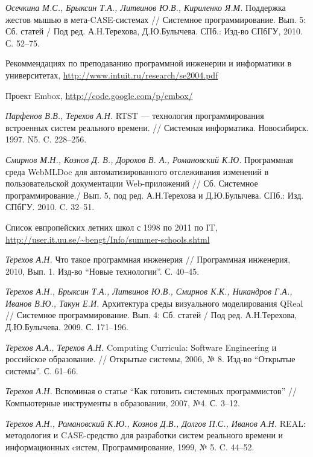 \documentclass[a4paper]{article}
\begin{document}
\begin{thebibliography}{9001}
  \emph{Осечкина М.С., Брыксин Т.А., Литвинов Ю.В., Кириленко Я.М.} Поддержка жестов мышью в мета-CASE-системах // Системное программирование. Вып. 5: Сб. статей / Под ред. А.Н.Терехова, Д.Ю.Булычева.  СПб.: Изд-во СПбГУ, 2010. С. 52--75.

   Рекоммендациях по преподаванию программной инженерии и информатики в университетах, \url{http://www.intuit.ru/research/se2004.pdf}  

   Проект Embox, \url{http://code.google.com/p/embox/}

   \emph{Парфенов В.В., Терехов А.Н.} RTST --- технология программирования встроенных систем реального времени. // Системная информатика. Новосибирск. 1997. N5. C. 228--256.
  
  \emph{Смирнов М.Н., Кознов Д. В., Дорохов В. А., Романовский К.Ю.} Программная среда WebMLDoc для автоматизированного отслеживания изменений в пользовательской документации Web-приложений // Сб. Системное программирование./ Вып. 5, под ред. А.Н.Терехова и Д.Ю.Булычева. СПб.: Изд. СПбГУ. 2010. C. 32--51.
  
   Список  евпропейских летних школ с 1998 по 2011 по IT, \url{http://user.it.uu.se/~bengt/Info/summer-schools.shtml}

  \emph{Терехов А.Н.} Что такое программная инженерия // Программная инженерия, 2010, Вып. 1. Изд-во ``Новые технологии''. С. 40--45.

   \emph{Терехов А.Н., Брыксин Т.А., Литвинов Ю.В., Смирнов К.К., Никандров  Г.А., Иванов В.Ю., Такун Е.И.} Архитектура среды визуального  моделирования QReal // Системное программирование. Вып. 4: Сб. статей  / Под ред. А.Н.Терехова, Д.Ю.Булычева. 2009. С. 171--196.

  \emph{Терехов А.А., Терехов А.Н.} Computing Curricula: Software Engineering и российское образование. // Открытые системы, 2006, № 8. Изд-во ``Открытые системы''. С. 61--66.

  \emph{Терехов А.Н.} Вспоминая о статье ``Как готовить системных программистов'' // Компьютерные инструменты в образовании, 2007, №4. С. 3--12.

   \emph{Терехов А.Н., Романовский К.Ю., Кознов Д.В., Долгов П.С., Иванов А.Н.} REAL: методология и CASE-средство для разработки систем реального времени и информационных cистем, Программирование, 1999, № 5. C. 44--52.


\end{thebibliography}
\end{document}
